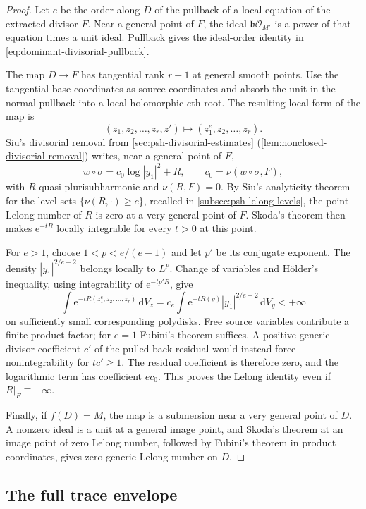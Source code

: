 \begin{proof}
Let $e$ be the order along $D$ of the pullback of a local equation of the extracted divisor $F$. Near a general point of $F$, the ideal $\mathfrak b\mathcal O_{M'}$ is a power of that equation times a unit ideal. Pullback gives the ideal-order identity in \eqref{eq:dominant-divisorial-pullback}.

The map $D\to F$ has tangential rank $r-1$ at general smooth points. Use the tangential base coordinates as source coordinates and absorb the unit in the normal pullback into a local holomorphic $e$th root. The resulting local form of the map is
\[
 (z_1,z_2,\ldots,z_r,z')\longmapsto(z_1^e,z_2,\ldots,z_r).
\]
Siu's divisorial removal from \cref{sec:psh-divisorial-estimates} (\cref{lem:nonclosed-divisorial-removal}) writes, near a general point of $F$,
\[
 w\circ\sigma=c_0\log|y_1|^2+R,
 \qquad c_0=\nu(w\circ\sigma,F),
\]
with $R$ quasi-plurisubharmonic and $\nu(R,F)=0$. By Siu's analyticity theorem for the level sets $\{\nu(R,\cdot)\geq c\}$, recalled in \cref{subsec:psh-lelong-levels}, the point Lelong number of $R$ is zero at a very general point of $F$. Skoda's theorem then makes $\mathrm e^{-tR}$ locally integrable for every $t>0$ at this point.

For $e>1$, choose $1<p<e/(e-1)$ and let $p'$ be its conjugate exponent. The density $|y_1|^{2/e-2}$ belongs locally to $L^p$. Change of variables and H\"older's inequality, using integrability of $\mathrm e^{-tp'R}$, give
\[
 \int \mathrm e^{-tR(z_1^e,z_2,\ldots,z_r)}\,\mathrm dV_z
 =c_e\int \mathrm e^{-tR(y)}|y_1|^{2/e-2}\,\mathrm dV_y<+\infty
\]
on sufficiently small corresponding polydisks. Free source variables contribute a finite product factor; for $e=1$ Fubini's theorem suffices. A positive generic divisor coefficient $c'$ of the pulled-back residual would instead force nonintegrability for $tc'\geq1$. The residual coefficient is therefore zero, and the logarithmic term has coefficient $ec_0$. This proves the Lelong identity even if $R|_F\equiv-\infty$.

Finally, if $f(D)=M$, the map is a submersion near a very general point of $D$. A nonzero ideal is a unit at a general image point, and Skoda's theorem at an image point of zero Lelong number, followed by Fubini's theorem in product coordinates, gives zero generic Lelong number on $D$.
\end{proof}

\subsection{The full trace envelope}

